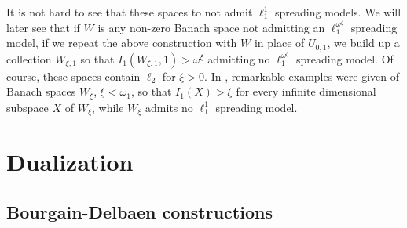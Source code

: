 \documentclass[12pt]{amsart}
\theoremstyle{definition}
\begin{document}
It is not hard to see that these spaces to not admit $\ell_1^1$ spreading models.  We will later see that if $W$ is any non-zero Banach space not admitting an $\ell_1^{\omega^\zeta}$ spreading model, if we repeat the above construction with $W$ in place of $U_{0,1}$, we build up a collection $W_{\xi, 1}$ so that $I_1(W_{\xi,1}, 1)>\omega^\xi$ admitting no $\ell_1^{\omega^\zeta}$ spreading model.  Of course, these spaces contain $\ell_2$ for $\xi>0$.  In \cite{AMP}, remarkable examples were given of Banach spaces $W_\xi$, $\xi<\omega_1$, so that $I_1(X)>\xi$ for every infinite dimensional subspace $X$ of $W_\xi$, while $W_\xi$ admits no $\ell_1^1$ spreading model.   































































\section{Dualization}


\subsection{Bourgain-Delbaen constructions}
\end{document}
